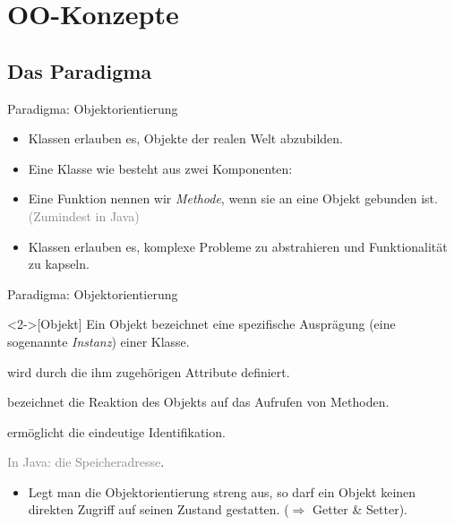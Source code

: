 
\section{OO-Konzepte}

\subsection{Das Paradigma}
\begin{frame}{Paradigma: Objektorientierung}
    \begin{itemize}[<+(1)->]
        \widei
        \item Klassen erlauben es, Objekte der realen Welt abzubilden.
        \item Eine Klasse wie  besteht aus zwei Komponenten: 
        \item Eine Funktion nennen wir \emph{Methode}, wenn sie an eine Objekt gebunden ist. \textcolor{gray}{(Zumindest in Java)}
        \item Klassen erlauben es, komplexe Probleme zu abstrahieren und Funktionalität zu kapseln.
    \end{itemize}
\end{frame}

\begin{frame}{Paradigma: Objektorientierung}
    \begin{definition}<2->[Objekt]
        Ein Objekt bezeichnet eine spezifische Ausprägung (eine sogenannte \emph{Instanz}) einer Klasse. \begin{description}
            \item[Objektzustand] wird durch die ihm zugehörigen Attribute definiert.
            \item[Objektverhalten] bezeichnet die Reaktion des Objekts auf das Aufrufen von Methoden.
            \item[Objektidentität] ermöglicht die eindeutige Identifikation.\par
            \textcolor{gray}{In Java: die Speicheradresse}.
        \end{description}
    \end{definition}
    \begin{itemize}[<+(1)->]
        \item Legt man die Objektorientierung streng aus,\pause{} so darf ein Objekt keinen direkten Zugriff auf seinen Zustand gestatten. (\(\Rightarrow\) Getter \& Setter).
    \end{itemize}
\end{frame}

